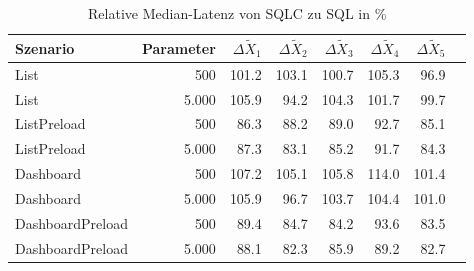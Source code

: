 
\begin{table}[ht]
\setlength{\extrarowheight}{-1pt}
\centering
\caption{Relative Median-Latenz von SQLC zu SQL in \%}
\begin{tabular}{lrrrrrrr}
\toprule
Szenario & Parameter & ${\Delta \tilde{X}_1}$ & ${\Delta \tilde{X}_2}$ & ${\Delta \tilde{X}_3}$ & ${\Delta \tilde{X}_4}$ & ${\Delta \tilde{X}_5}$ \\
\midrule
	List & 500 & \cellcolor{red!1}  101.2 & \cellcolor{red!2}  103.1 & \cellcolor{red!0}  100.7 & \cellcolor{red!3}  105.3 & \cellcolor{green!2}  96.9 \\
	List & 5.000 & \cellcolor{red!3}  105.9 & \cellcolor{green!3}  94.2 & \cellcolor{red!2}  104.3 & \cellcolor{red!1}  101.7 & \cellcolor{green!0}  99.7 \\
	ListPreload & 500 & \cellcolor{green!7}  86.3 & \cellcolor{green!6}  88.2 & \cellcolor{green!6}  89.0 & \cellcolor{green!4}  92.7 & \cellcolor{green!7}  85.1 \\
	ListPreload & 5.000 & \cellcolor{green!6}  87.3 & \cellcolor{green!8}  83.1 & \cellcolor{green!7}  85.2 & \cellcolor{green!4}  91.7 & \cellcolor{green!8}  84.3 \\
	Dashboard & 500 & \cellcolor{red!4}  107.2 & \cellcolor{red!3}  105.1 & \cellcolor{red!3}  105.8 & \cellcolor{red!7}  114.0 & \cellcolor{red!1}  101.4 \\
	Dashboard & 5.000 & \cellcolor{red!3}  105.9 & \cellcolor{green!2}  96.7 & \cellcolor{red!2}  103.7 & \cellcolor{red!2}  104.4 & \cellcolor{red!0}  101.0 \\
	DashboardPreload & 500 & \cellcolor{green!5}  89.4 & \cellcolor{green!8}  84.7 & \cellcolor{green!8}  84.2 & \cellcolor{green!3}  93.6 & \cellcolor{green!8}  83.5 \\
	DashboardPreload & 5.000 & \cellcolor{green!6}  88.1 & \cellcolor{green!9}  82.3 & \cellcolor{green!7}  85.9 & \cellcolor{green!5}  89.2 & \cellcolor{green!9}  82.7 \\
\bottomrule
\end{tabular}
\label{tab:relative_latenz_sqlc}
\end{table}
	